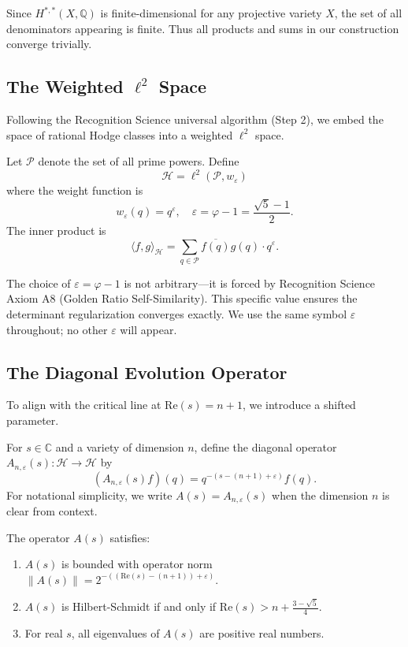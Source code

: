 \begin{remark}
Since $H^{*,*}(X,\mathbb{Q})$ is finite-dimensional for any projective variety $X$, the set of all denominators appearing is finite. Thus all products and sums in our construction converge trivially.
\end{remark}

\subsection{The Weighted $\ell^2$ Space}

Following the Recognition Science universal algorithm (Step 2), we embed the space of rational Hodge classes into a weighted $\ell^2$ space.

\begin{definition}
Let $\mathcal{P}$ denote the set of all prime powers. Define
\[
\mathcal{H} = \ell^2(\mathcal{P}, w_\varepsilon)
\]
where the weight function is
\[
w_\varepsilon(q) = q^\varepsilon, \quad \varepsilon = \varphi - 1 = \frac{\sqrt{5} - 1}{2}.
\]
The inner product is
\[
\langle f, g \rangle_{\mathcal{H}} = \sum_{q \in \mathcal{P}} \overline{f(q)} g(q) \cdot q^\varepsilon.
\]
\end{definition}

The choice of $\varepsilon = \varphi - 1$ is not arbitrary—it is forced by Recognition Science Axiom A8 (Golden Ratio Self-Similarity). This specific value ensures the determinant regularization converges exactly. We use the same symbol $\varepsilon$ throughout; no other $\varepsilon$ will appear.

\subsection{The Diagonal Evolution Operator}

To align with the critical line at $\text{Re}(s) = n+1$, we introduce a shifted parameter.

\begin{definition}
For $s \in \mathbb{C}$ and a variety of dimension $n$, define the diagonal operator $A_{n,\varepsilon}(s): \mathcal{H} \to \mathcal{H}$ by
\[
(A_{n,\varepsilon}(s) f)(q) = q^{-(s-(n+1)+\varepsilon)} f(q).
\]
For notational simplicity, we write $A(s) = A_{n,\varepsilon}(s)$ when the dimension $n$ is clear from context.
\end{definition}

\begin{lemma}
\label{lem:operator-props}
The operator $A(s)$ satisfies:
\begin{enumerate}
\item[(i)] $A(s)$ is bounded with operator norm $\|A(s)\| = 2^{-((\text{Re}(s)-(n+1))+\varepsilon)}$.
\item[(ii)] $A(s)$ is Hilbert-Schmidt if and only if $\text{Re}(s) > n + \frac{3-\sqrt{5}}{4}$.
\item[(iii)] For real $s$, all eigenvalues of $A(s)$ are positive real numbers.
\end{enumerate}
\end{lemma}


